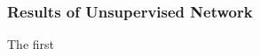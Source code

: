 \documentclass[a4paper]{article}
\begin{document}
\subsubsection{Results of Unsupervised Network}

The first 




\end{document}
